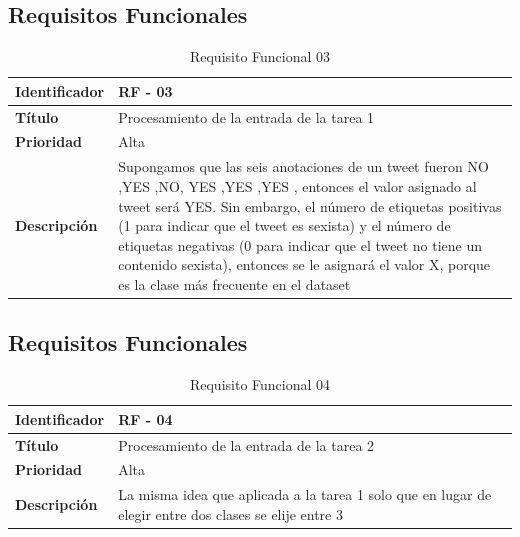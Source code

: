 \subsection {Requisitos Funcionales}
\begin{table}[H] 
\begin{center}
\begin{tabular} {|P{4cm}|P{10cm}|}\hline
   {\bf Identificador} &{\bf RF - 03}\\ \hline
  \textbf{Título}& Procesamiento de la entrada de la tarea 1\\ \hline
  \textbf{Prioridad}& Alta  \\ \hline
  \textbf{Descripción}&  Supongamos que las seis anotaciones de un tweet fueron NO ,YES ,NO, YES ,YES ,YES , entonces el valor asignado al tweet será YES. Sin embargo, el número de etiquetas positivas (1 para indicar que el tweet es sexista) y el número de etiquetas negativas (0 para indicar que el tweet no tiene un contenido sexista), entonces se le asignará el valor X, porque es la clase más frecuente en el dataset\\ \hline
\end{tabular}
\end{center}
\vspace{-0.6cm}
\caption{Requisito Funcional 03}
\end{table}


\subsection {Requisitos Funcionales}
\begin{table}[H] 
\begin{center}
\begin{tabular} {|P{4cm}|P{10cm}|}\hline
   {\bf Identificador} &{\bf RF - 04}\\ \hline
  \textbf{Título}& Procesamiento de la entrada de la tarea 2\\ \hline
  \textbf{Prioridad}& Alta  \\ \hline
  \textbf{Descripción}&  La misma idea que aplicada a la tarea 1 solo que en lugar de elegir entre dos clases se elije entre 3\\ \hline
\end{tabular}
\end{center}
\vspace{-0.6cm}
\caption{Requisito Funcional 04}
\end{table}


